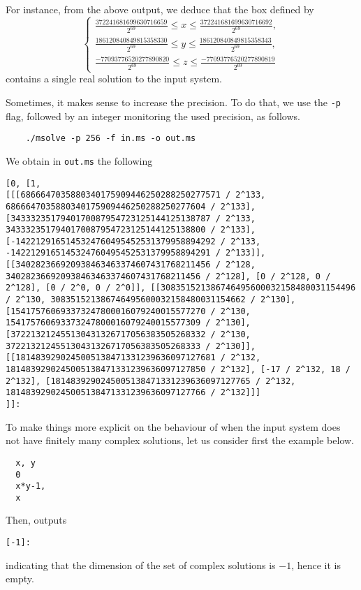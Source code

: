 \documentclass[a4paper,english,11pt]{scrartcl}
\theoremstyle{definition}
\theoremstyle{remark}
\def\leq{\leqslant}
\begin{document}
For instance, from the above output, we deduce that the box defined by 
\[
  \left \{
  \begin{array}{l}
  \frac{372241681699630716659}{2^{69}}\leq x \leq
  \frac{372241681699630716692}{2^{69}}, \\
  \frac{186120840849815358330}{2^{69}}\leq
  y \leq \frac{186120840849815358343}{2^{69}}, \\
  \frac{-77093776520277890820}{2^{69}}
  \leq z \leq \frac{-77093776520277890819}{2^{69}}
\end{array}\right .
\]
contains a single real solution to the input system.

Sometimes, it makes sense to increase the precision. To do that, we use the
\verb+-p+ flag, followed by an integer monitoring the used precision, as
follows.
\begin{tcolorbox}
  \begin{lstlisting}
    ./msolve -p 256 -f in.ms -o out.ms 
  \end{lstlisting}
\end{tcolorbox}
We obtain in \verb+out.ms+ the following
\begin{tcolorbox}
{\tiny\begin{lstlisting}[breaklines]
[0, [1,
[[[6866647035880340175909446250288250277571 / 2^133, 6866647035880340175909446250288250277604 / 2^133], [3433323517940170087954723125144125138787 / 2^133, 3433323517940170087954723125144125138800 / 2^133], [-1422129165145324760495452531379958894292 / 2^133, -1422129165145324760495452531379958894291 / 2^133]], [[340282366920938463463374607431768211456 / 2^128, 340282366920938463463374607431768211456 / 2^128], [0 / 2^128, 0 / 2^128], [0 / 2^0, 0 / 2^0]], [[308351521386746495600032158480031154496 / 2^130, 308351521386746495600032158480031154662 / 2^130], [154175760693373247800016079240015577270 / 2^130, 154175760693373247800016079240015577309 / 2^130], [372213212455130431326717056383505268332 / 2^130, 372213212455130431326717056383505268333 / 2^130]], [[1814839290245005138471331239636097127681 / 2^132, 1814839290245005138471331239636097127850 / 2^132], [-17 / 2^132, 18 / 2^132], [1814839290245005138471331239636097127765 / 2^132, 1814839290245005138471331239636097127766 / 2^132]]]
]]:
\end{lstlisting}}
\end{tcolorbox}

To make things more explicit on the behaviour of \msolve when the input system
does not have finitely many complex solutions, let us consider first the example
below.
\begin{tcolorbox}
\begin{verbatim}
  x, y
  0
  x*y-1,
  x
\end{verbatim}
\end{tcolorbox}
Then, \msolve outputs
\begin{tcolorbox}
\begin{verbatim}
[-1]:
\end{verbatim}
\end{tcolorbox}
indicating that the dimension of the set of complex solutions is $-1$, hence it
is empty.
\end{document}
